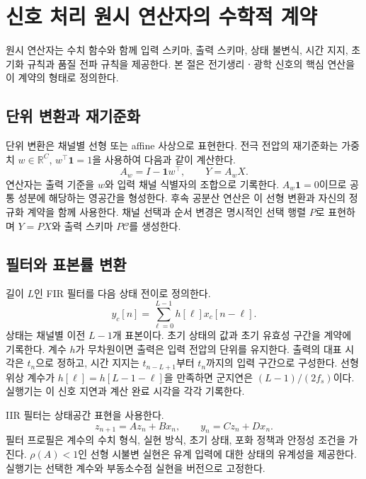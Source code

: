 \section{신호 처리 원시 연산자의 수학적 계약}
\label{sec:operators}
원시 연산자는 수치 함수와 함께 입력 스키마, 출력 스키마, 상태 불변식, 시간 지지,
초기화 규칙과 품질 전파 규칙을 제공한다. 본 절은 전기생리ㆍ광학 신호의 핵심 연산을
이 계약의 형태로 정의한다.

\subsection{단위 변환과 재기준화}
단위 변환은 채널별 선형 또는 affine 사상으로 표현한다. 전극 전압의 재기준화는
가중치 $w\in\mathbb R^C$, $w^\top\mathbf 1=1$을 사용하여 다음과 같이 계산한다.
\begin{equation}
 A_w=I-\mathbf 1w^\top,\qquad Y=A_wX.
 \label{eq:reref}
\end{equation}
연산자는 출력 기준을 $w$와 입력 채널 식별자의 조합으로 기록한다.
$A_w\mathbf 1=0$이므로 공통 성분에 해당하는 영공간을 형성한다.
후속 공분산 연산은 이 선형 변환과 자신의 정규화 계약을 함께 사용한다.
채널 선택과 순서 변경은 명시적인 선택 행렬 $P$로 표현하며 $Y=PX$와 출력 스키마 $P\mathcal C$를 생성한다.

\subsection{필터와 표본률 변환}
길이 $L$인 FIR 필터를 다음 상태 전이로 정의한다.
\begin{equation}
 y_c[n]=\sum_{\ell=0}^{L-1}h[\ell]x_c[n-\ell].
 \label{eq:fir}
\end{equation}
상태는 채널별 이전 $L-1$개 표본이다. 초기 상태의 값과 초기 유효성 구간을 계약에 기록한다.
계수 $h$가 무차원이면 출력은 입력 전압의 단위를 유지한다.
출력의 대표 시각은 $t_n$으로 정하고, 시간 지지는 $t_{n-L+1}$부터 $t_n$까지의 입력 구간으로 구성한다.
선형 위상 계수가 $h[\ell]=h[L-1-\ell]$을 만족하면 군지연은 $(L-1)/(2f_s)$이다.
실행기는 이 신호 지연과 계산 완료 시각을 각각 기록한다.

IIR 필터는 상태공간 표현을 사용한다.
\begin{equation}
 z_{n+1}=Az_n+Bx_n,\qquad y_n=Cz_n+Dx_n.
\end{equation}
필터 프로필은 계수의 수치 형식, 실현 방식, 초기 상태, 포화 정책과 안정성 조건을 가진다.
$\rho(A)<1$인 선형 시불변 실현은 유계 입력에 대한 상태의 유계성을 제공한다.
실행기는 선택한 계수와 부동소수점 실현을 버전으로 고정한다.

